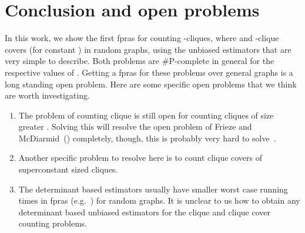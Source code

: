 \documentclass[runningheads,a4paper]{llncs}
\begin{document}
\section{Conclusion and open problems}
In this work, we show the first fpras for counting -cliques, where  and -clique covers (for constant ) in random graphs, using the unbiased estimators that are very simple to describe. Both problems are \#P-complete in general for the respective values of . 
Getting a fpras for these problems over general graphs is a long standing open problem. Here are some specific open problems that we think are worth investigating.
\begin{enumerate}
\item The problem of counting clique is still open for counting cliques of size greater . Solving this will resolve the open problem of Frieze and McDiarmid~(\cite{FM97}) completely, though, this is probably very hard to solve~\cite{CE11}.
\item Another specific problem to resolve here is to count clique covers of superconstant sized cliques. 
\item The determinant based estimators usually have smaller worst case running times in fpras (e.g.~\cite{C04}) for random graphs. It is unclear to us how to obtain any determinant based unbiased estimators for the clique and clique cover counting problems.
\end{enumerate}



\end{document}
